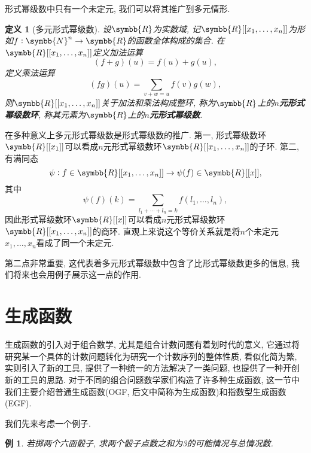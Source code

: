 \documentclass[chinese]{assignment}[2019/10/15]
\newcommand{\BR}{\symbb{R}}
\newcommand{\BN}{\symbb{N}}
\theoremstyle{plain}
\newtheorem{definition}[theorem]{定义}
\newtheorem{example}[theorem]{例}
\begin{document}
    形式幂级数中只有一个未定元, 我们可以将其推广到多元情形.

    \begin{definition}[多元形式幂级数]
        设$\BR$为实数域, 记$\BR[[x_1, \dotsc, x_n]]$为形如$f:\BN^n\to\BR$的函数全体构成的集合. 在$\BR[[x_1, \dotsc, x_n]]$定义加法运算
        \begin{equation}
            (f+g)(u) = f(u)+g(u),
        \end{equation}
        定义乘法运算
        \begin{equation}
            (fg)(u) = \sum_{v+w=u}f(v)g(w),
        \end{equation}
        则$\BR[[x_1, \dotsc, x_n]]$关于加法和乘法构成整环, 称为$\BR$上的\textbf{$n$元形式幂级数环}, 称其元素为$\BR$上的\textbf{$n$元形式幂级数}.
    \end{definition}

    在多种意义上多元形式幂级数是形式幂级数的推广. 第一, 形式幂级数环$\BR[[x_1]]$可以看成$n$元形式幂级数环$\BR[[x_1, \dotsc, x_n]]$的子环. 第二, 有满同态
    \begin{equation}
        \psi: f\in\BR[[x_1, \dotsc, x_n]]\to \psi(f)\in\BR[[x]],
    \end{equation}
    其中
    \begin{equation}
        \psi(f)(k) = \sum_{l_1+\dotsb+l_n=k}f(l_1, \dotsc, l_n),
    \end{equation}
    因此形式幂级数环$\BR[[x]]$可以看成$n$元形式幂级数环$\BR[[x_1, \dotsc, x_n]]$的商环. 直观上来说这个等价关系就是将$n$个未定元$x_1, \dotsc, x_n$看成了同一个未定元.

    第二点非常重要, 这代表着多元形式幂级数中包含了比形式幂级数更多的信息, 我们将来也会用例子展示这一点的作用.

    \section{生成函数}

    生成函数的引入对于组合数学, 尤其是组合计数问题有着划时代的意义, 它通过将研究某一个具体的计数问题转化为研究一个计数序列的整体性质, 看似化简为繁, 实则引入了新的工具, 提供了一种统一的方法解决了一类问题, 也提供了一种开创新的工具的思路. 对于不同的组合问题数学家们构造了许多种生成函数, 这一节中我们主要介绍普通生成函数(OGF, 后文中简称为生成函数)和指数型生成函数(EGF).

    我们先来考虑一个例子.

    \begin{example}
        若掷两个六面骰子, 求两个骰子点数之和为3的可能情况与总情况数.
    \end{example}
\end{document}
